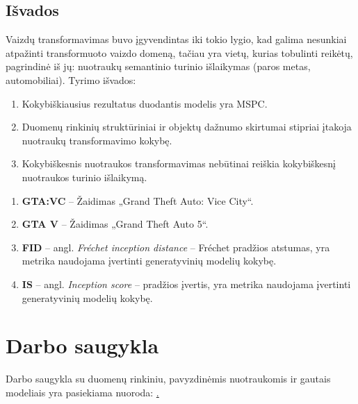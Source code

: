 \documentclass{VUMIFPSkursinis}
\begin{document}
    \subsection*{Išvados}
        Vaizdų transformavimas buvo įgyvendintas iki tokio lygio, kad galima nesunkiai atpažinti transformuoto vaizdo domeną, tačiau yra vietų, kurias tobulinti reikėtų, pagrindinė iš jų: nuotraukų semantinio turinio išlaikymas (paros metas, automobiliai).
        Tyrimo išvados:
        \begin{enumerate}
            \item Kokybiškiausius rezultatus duodantis modelis yra MSPC.
            \item Duomenų rinkinių struktūriniai ir objektų dažnumo skirtumai stipriai įtakoja nuotraukų transformavimo kokybę.
            \item Kokybiškesnis nuotraukos transformavimas nebūtinai reiškia kokybiškesnį nuotraukos turinio išlaikymą.
        \end{enumerate}

    \begin{enumerate}
        \item \textbf{GTA:VC} – Žaidimas „Grand Theft Auto: Vice City“.
        \item \textbf{GTA V} – Žaidimas „Grand Theft Auto 5“.
        \item \textbf{FID} – angl. \emph{Fréchet inception distance} – Fréchet pradžios atstumas, yra metrika naudojama įvertinti generatyvinių modelių kokybę.
        \item \textbf{IS} – angl. \emph{Inception score} – pradžios įvertis, yra metrika naudojama įvertinti generatyvinių modelių kokybę.
    \end{enumerate}
    
        

\printbibliography[heading=bibintoc]

\appendix
    \section{Darbo saugykla}
        Darbo saugykla su duomenų rinkiniu, pavyzdinėmis nuotraukomis ir gautais modeliais yra pasiekiama nuoroda: \href{https://github.com/0ksas/kursinis}.
\end{document}
